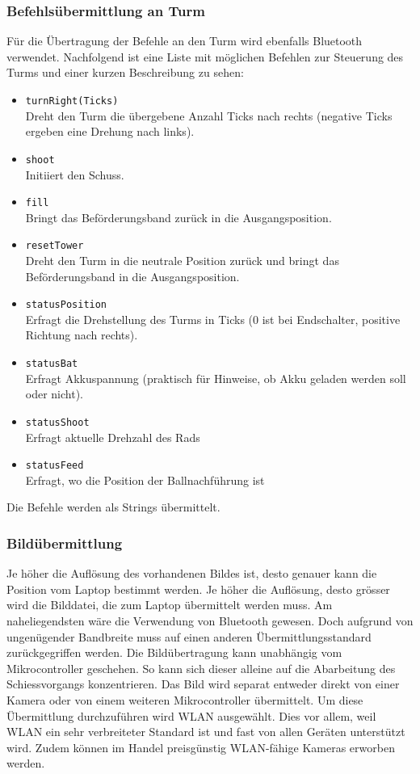 \subsubsection{Befehlsübermittlung an Turm}
Für die Übertragung der Befehle an den Turm wird ebenfalls Bluetooth 
verwendet. Nachfolgend ist eine Liste mit möglichen Befehlen zur Steuerung des 
Turms und einer kurzen Beschreibung zu sehen:
\begin{itemize}
		\item \verb?turnRight(Ticks)?  \\
            Dreht den Turm die übergebene Anzahl Ticks nach rechts (negative 
            Ticks ergeben eine Drehung nach links).
		\item \verb?shoot? \\
            Initiiert den Schuss.
		\item \verb?fill? \\
            Bringt das Beförderungsband zurück in die Ausgangsposition.
		\item \verb?resetTower? \\
            Dreht den Turm in die neutrale Position zurück und bringt das 
            Beförderungsband in die Ausgangsposition.
		\item \verb?statusPosition? \\
            Erfragt die Drehstellung des Turms in Ticks (0 ist bei 
            Endschalter, positive Richtung nach rechts).
		\item \verb?statusBat? \\
            Erfragt Akkuspannung (praktisch für Hinweise, ob Akku geladen 
            werden soll oder nicht).
		\item \verb?statusShoot? \\
            Erfragt aktuelle Drehzahl des Rads
		\item \verb?statusFeed? \\
            Erfragt, wo die Position der Ballnachführung ist
	\end{itemize}
Die Befehle werden als Strings übermittelt.
\subsubsection{Bildübermittlung}
Je höher die Auflösung des vorhandenen Bildes ist, desto genauer kann die 
Position vom Laptop bestimmt werden. Je höher die Auflösung, desto grösser 
wird die Bilddatei, die zum Laptop übermittelt werden muss. Am naheliegendsten 
wäre die Verwendung von Bluetooth gewesen. Doch aufgrund von ungenügender 
Bandbreite muss auf einen anderen Übermittlungsstandard zurückgegriffen 
werden. Die Bildübertragung kann unabhängig vom Mikrocontroller geschehen. So 
kann sich dieser alleine auf die Abarbeitung des Schiessvorgangs 
konzentrieren. Das Bild wird separat entweder direkt von einer Kamera oder von 
einem weiteren Mikrocontroller übermittelt. Um diese Übermittlung 
durchzuführen wird WLAN ausgewählt. Dies vor allem, weil WLAN ein sehr 
verbreiteter Standard ist und fast von allen Geräten unterstützt wird. Zudem 
können im Handel preisgünstig WLAN-fähige Kameras erworben werden.
